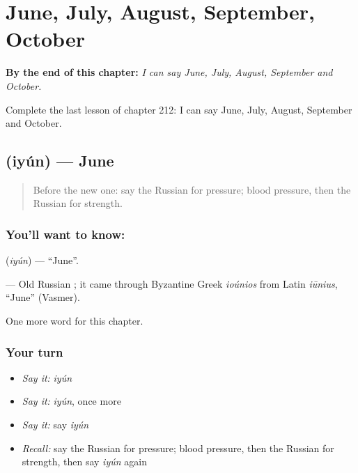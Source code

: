 
\chapter{June, July, August, September, October}
\label{ch:ru-june-july-august-september-october}

\begin{chapteropening}
\textbf{By the end of this chapter:} \emph{I can say June, July, August, September and October.}

Complete the last lesson of chapter 212: I can say June, July, August, September and October.
\end{chapteropening}

\section[\texorpdfstring{\ru{июнь} (iyún)}{июнь (iyún)}]{ (iyún) — June}

\label{lesson:RU-C212-iyun}



\begin{quote}
Before the new one: say the Russian for pressure; blood pressure, then the Russian for strength.
\end{quote}

\subsection*{You'll want to know: }
\textbf{} (\emph{iyún}) — \textquotedblleft{}June\textquotedblright{}.

\begin{cousinweb}
\textbf{} — Old Russian \emph{}; it came through Byzantine Greek \emph{ioúnios} from Latin \emph{iūnius}, \textquotedblleft{}June\textquotedblright{} (Vasmer).
\end{cousinweb}

\begin{grammarlens}[title={What you've built}]
One more word for this chapter.
\end{grammarlens}

\subsection*{Your turn}
\begin{itemize}
\raggedright
  \item \emph{Say it:} \emph{iyún}
  \item \emph{Say it:} \emph{iyún}, once more
  \item \emph{Say it:} say \emph{iyún}
  \item \emph{Recall:} say the Russian for pressure; blood pressure, then the Russian for strength, then say \emph{iyún} again
\end{itemize}

